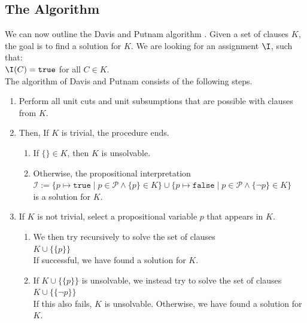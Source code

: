 \subsection{The Algorithm}
We can now outline the Davis and Putnam algorithm .
Given a set of clauses $K$, the goal is to find a solution for $K$. We
are looking for an assignment $\I$, such that: \\[0.2cm]
\hspace*{1.3cm} $\I(C) = \texttt{true}$ \quad for all $C \in K$.\\[0.2cm]
The algorithm of Davis and Putnam consists of the following steps.
\begin{enumerate}
\item Perform all unit cuts and unit subsumptions that are possible with clauses from $K$.
\item Then, If $K$ is trivial, the procedure ends.
     \begin{enumerate}
     \item If $\{\} \in K$, then $K$ is unsolvable.
     \item Otherwise, the propositional interpretation
           \\[0.2cm]
           \hspace*{1.3cm}
           $\mathcal{I} := \bigl\{ p \mapsto \mathtt{true}  \mid p \in \mathcal{P} \wedge \{p\}\in K\bigr\} \cup
                           \bigl\{ p \mapsto \mathtt{false} \mid p \in \mathcal{P} \wedge \{\neg p\}\in K\bigr\}  $
           \\[0.2cm]
           is a solution for $K$.     
     \end{enumerate}
\item If $K$ is not trivial, select a propositional variable $p$ that appears in $K$.
      \begin{enumerate}
      \item We then try recursively to solve the set of clauses \\[0.2cm]
            \hspace*{1.3cm}  $K \cup \bigl\{\{p\}\bigr\}$ \\[0.2cm]
            If successful, we have found a solution for $K$.
      \item If $K \cup \bigl\{\{p\}\bigr\}$ is unsolvable, we instead try to solve the set of clauses
            \\[0.2cm] 
            \hspace*{1.3cm} $K \cup \bigl\{\{\neg p\}\bigr\}$
            \\[0.2cm]
            If this also fails, $K$ is unsolvable. Otherwise,
            we have found a solution for $K$.
      \end{enumerate}
\end{enumerate}
